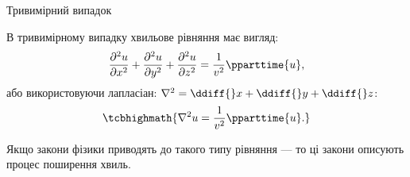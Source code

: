 \documentclass[onlytextwidth]{beamer}
\begin{document}
\begin{frame}{Тривимірний випадок}{}

	\begin{block}{}\justifying
		В тривимірному випадку \alert{хвильове рівняння} має вигляд:
		\begin{equation*}
			\frac{\partial^2 u}{\partial x^2} + \frac{\partial^2 u}{\partial y^2} + \frac{\partial^2 u}{\partial z^2} = \frac1{v^2}\pparttime{u},
		\end{equation*}
		або використовуючи лапласіан: $\nabla^2 = \ddiff{}x + \ddiff{}y +\ddiff{}z$:
		\begin{equation*}
			\tcbhighmath{\nabla^2 u = \frac1{v^2}\pparttime{u}.}
		\end{equation*}
	\end{block}
	\begin{alertblock}{}\centering
		Якщо закони фізики приводять до такого типу рівняння --- то ці закони описують процес поширення хвиль.
	\end{alertblock}
\end{frame}
\end{document}
